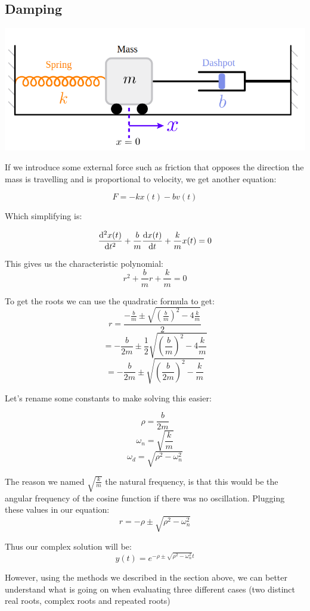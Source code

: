 \documentclass{report}
\begin{document}
\subsection{Damping}

\includegraphics[scale=0.4]{spring-mass.png}


If we introduce some external force such as friction that opposes the direction the mass is travelling and is proportional to velocity, we get another equation:

$$F = -kx(t) - bv(t)$$

Which simplifying is:

$$\dv[2]{x(t)}{t} + \frac{b}{m}\dv{x(t)}{t} + \frac{k}{m}x(t) = 0$$

This gives us the characteristic polynomial:
$$r^2 + \frac{b}{m}r + \frac{k}{m} = 0$$

To get the roots we can use the quadratic formula to get:
$$r = \frac{-\frac{b}{m} \pm \sqrt{(\frac{b}{m})^2-4\frac{k}{m}}}{2}$$
$$ = -\frac{b}{2m} \pm \frac{1}{2}\sqrt{\left(\frac{b}{m}\right)^2-4\frac{k}{m}}$$
$$ = -\frac{b}{2m} \pm \sqrt{\left(\frac{b}{2m}\right)^2-\frac{k}{m}}$$

Let's rename some constants to make solving this easier:

$$\rho = \frac{b}{2m}$$
$$\omega_n = \sqrt{\frac{k}{m}}$$
$$\omega_d = \sqrt{\rho^2 - \omega_n^2}$$

The reason we named $\sqrt{\frac{k}{m}}$ the natural frequency, is that this would be the angular frequency of the cosine function if there was no oscillation. Plugging these values in our equation:
$$r = -\rho \pm \sqrt{\rho^2-\omega_n^2}$$

Thus our complex solution will be:
$$y(t) = e^{-\rho \pm \sqrt{\rho^2-\omega_n^2}t}$$

However, using the methods we described in the section above, we can better understand what is going on when evaluating three different cases (two distinct real roots, complex roots and repeated roots)
\end{document}
